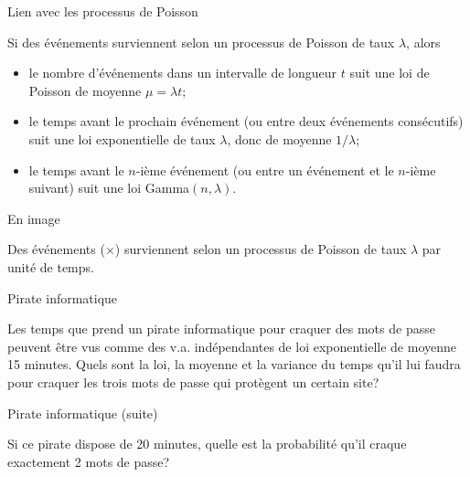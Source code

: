 \documentclass{BeamerTemplate}
\newcommand{\cibleReponse}{}
\newcommand{\lienreponse}[1]{\gdef\cibleReponse{#1}}
\begin{document}
\begin{frame}[t]{Lien avec les processus de Poisson}

Si des événements surviennent selon un processus de Poisson de taux $\lambda$, alors
\begin{itemize}\itemsep6pt
 \item le nombre d'événements dans un intervalle de longueur $t$
 suit une loi de Poisson de moyenne $\mu=\lambda t$;
 \item le temps avant le prochain événement (ou entre deux événements consécutifs)
 suit une loi exponentielle de taux $\lambda$, donc de moyenne $1/\lambda$;
 \item le temps avant le $n$-ième événement (ou entre un événement et le $n$-ième
 suivant) suit une loi Gamma$(n,\lambda)$.
\end{itemize}

\end{frame}


\begin{frame}[t]{En image}

{\small Des événements ($\times$) surviennent selon un processus de Poisson de taux $\lambda$ par unité de temps.}

\vspace{2.2cm}
\begin{center}
\end{center}

\end{frame}


\begin{frame}[t,label=expirate]{Pirate informatique}

{\small
Les temps que prend un pirate informatique pour craquer des mots de passe peuvent
être vus comme des v.a. indépendantes de loi exponentielle de moyenne 15 minutes.
Quels sont la loi, la moyenne et la variance du temps qu'il lui faudra pour craquer
les trois mots de passe qui protègent un certain site?}
\lienreponse{rep-ex1}
\end{frame}


\begin{frame}[t]{Pirate informatique (suite)}

{\small
Si ce pirate dispose de 20 minutes, quelle est la probabilité qu'il craque exactement
2 mots de passe?
}
\lienreponse{rep-ex1}
\end{frame}
\end{document}

